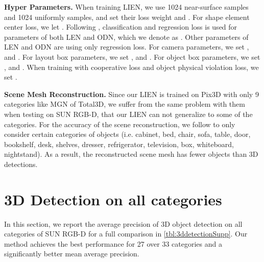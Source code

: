 \documentclass[final]{cvpr}
\let\orgautoref\autoref
\renewcommand{\autoref}[1]{\def\figureautorefname{Fig.}\orgautoref{#1}}
\begin{document}
\noindent\textbf{Hyper Parameters.}
When training LIEN, we use 1024 near-surface samples and 1024 uniformly samples, and set their loss weight  and .
For shape element center loss, we let .
Following \cite{nie2020total3dunderstanding, huang2018holistic}, classification and regression loss is used for parameters of both LEN and ODN, which we denote as . Other parameters of LEN and ODN are using only regression loss.
For camera parameters, we set , and .
For layout box parameters, we set , and .
For object box parameters, we set , and .
When training with cooperative loss and object physical violation loss, we set .


\noindent\textbf{Scene Mesh Reconstruction.}
Since our LIEN is trained on Pix3D with only 9 categories like MGN of Total3D, we suffer from the same problem with them when testing on SUN RGB-D, that our LIEN can not generalize to some of the categories.
For the accuracy of the scene reconstruction, we follow \cite{nie2020total3dunderstanding} to only consider certain categories of objects (i.e. cabinet, bed, chair, sofa, table, door, bookshelf, desk, shelves, dresser, refrigerator, television, box, whiteboard, nightstand).
As a result, the reconstructed scene mesh has fewer objects than 3D detections.



\section{3D Detection on all categories}
In this section, we report the average precision of 3D object detection on all categories of SUN RGB-D for a full comparison in \autoref{tbl:3ddetectionSupp}.
Our method achieves the best performance for 27 over 33 categories and a significantly better mean average precision.
\end{document}
